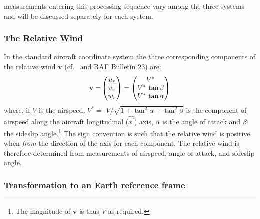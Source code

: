 \documentclass[12pt,twoside,english]{article}\usepackage[]{graphicx}\usepackage[]{color}
\let\OrgIndex\index
\renewcommand*{\index}[1]{\OrgIndex{#1}}
\begin{document}
measurements entering this processing sequence vary among the three systems and will be discussed separately for each system. 


\subsubsection{The Relative Wind\label{sub:The-Relative-Wind}}

In the standard aircraft coordinate system the three corresponding components of the relative wind $\mathbf{v}$ (cf.~\citet{NCAR_OpenSky_TECH-NOTE-000-000-000-064} and \href{https://www.eol.ucar.edu/raf/Bulletins/bulletin23.html}{RAF Bulletin 23}) are:\\
\begin{equation}
\mathbf{v=}\begin{pmatrix}u_{r}\\ v_{r}\\ w_{r} 
\end{pmatrix}=\begin{pmatrix}V^{*}\\ V^{*}\thinspace\tan\beta\\ V^{*}\thinspace\tan\alpha 
\end{pmatrix}\label{eq:relative wind}
\end{equation}
where, if $V$ is the airspeed, $V^{*}=$ $V/\sqrt{1+\tan^{2}\alpha+\tan^{2}\beta}$ is the component of airspeed along the aircraft longitudinal ($\hat{x^{\prime}}$) axis, $\alpha$ is the angle of attack and $\beta$ the sideslip angle.\footnote{The magnitude of $\mathbf{v}$ is thus $V$ as required.} The sign convention is such that the relative wind is positive when \emph{from} the direction of the axis for each component. The relative wind is therefore determined from measurements of airspeed, angle of attack, and sideslip angle. 


\subsubsection{Transformation to an Earth reference frame\label{sub:EarthRef}}
\end{document}
